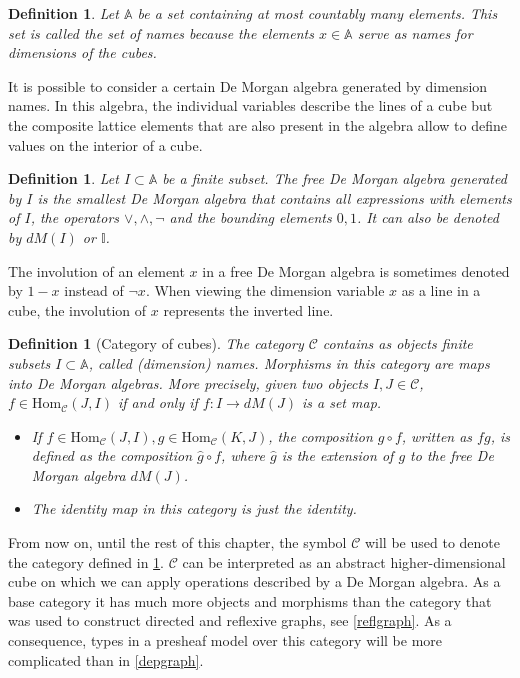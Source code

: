 \documentclass[12pt,a4paper,twoside,xetex]{book}
\newcommand{\keyword}[1]{\emph{#1}\index{#1}}
\newtheorem{definition}[theorem]{Definition}
\newcommand{\homo}[3]{\text{Hom}_{#1}\left(#2,#3\right)}
\begin{document}
\begin{definition}
Let $\mathbb{A}$ be a set containing at most countably many elements. This set is called the \keyword{set of names} because the elements $x \in \mathbb{A}$ serve as names for dimensions of the cubes. 
\end{definition}

It is possible to consider a certain De Morgan algebra generated by dimension names. In this algebra, the individual variables describe the lines of a cube but the composite lattice elements that are also present in the algebra allow to define values on the interior of a cube.


\begin{definition}\label{freedm}
Let $I \subset \mathbb{A}$ be a finite subset. The \keyword{free De Morgan algebra} generated by $I$ is the smallest De Morgan algebra that contains all expressions with elements of $I$, the operators $\vee, \wedge, \neg$ and  the bounding elements $0, 1$. It can also be denoted by $dM(I)$ or $\mathbb{I}$.
\end{definition}

The involution of an element $x$ in a free De Morgan algebra is sometimes denoted by $1- x$ instead  of $\neg x$. When viewing the dimension variable $x$ as a line in a cube, the involution of $x$ represents the inverted line. 




\begin{definition}[Category of cubes]\label{cubcat}
  The category $\mathcal{C}$ contains as objects finite subsets $I \subset \mathbb{A}$, called (dimension) names. Morphisms in this category are maps into De Morgan algebras. More precisely, given two objects $I,J \in \mathcal{C}$, $f \in \text{Hom}_{\mathcal{C}}(J,I)$ if and only if $f: I \rightarrow dM(J)$ is a set map.
  \begin{itemize}
  \item  If $f \in \homo{\mathcal{C}}{J}{I}, g \in \homo{\mathcal{C}}{K}{J}$, the composition $g \circ f$, written as $fg$, is defined as the composition  $\hat{g} \circ f$, where $\hat{g}$ is the extension of $g$ to the free De Morgan algebra $dM(J)$.
    \item The identity map in this category is just the identity.
\end{itemize}
    \end{definition}

From now on, until the rest of this chapter, the symbol $\mathcal{C}$ will be used to denote the category defined in \cref{cubcat}. $\mathcal{C}$ can be interpreted as an abstract higher-dimensional cube on which we can apply operations described by a De Morgan algebra. As a base category it has much more objects and morphisms than the category that was used to construct directed and reflexive graphs, see \cref{reflgraph}. As a consequence, types in a presheaf model over this category will be more complicated than in \cref{depgraph}.
\end{document}
